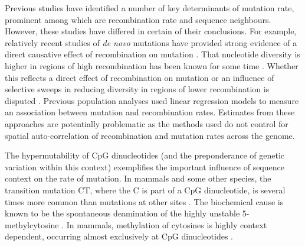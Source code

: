 Previous studies have identified a number of key determinants of mutation rate, prominent among which are recombination rate and sequence neighbours. However, these studies have differed in certain of their conclusions. For example, relatively recent studies of \textit{de novo} mutations have provided strong evidence of a direct causative effect of recombination on mutation \citep{Arbeithuber_Crossovers_2015}. That nucleotide diversity is higher in regions of high recombination has been known for some time \citep{Lercher_2002, Duret_2008}. Whether this reflects a direct effect of recombination on mutation or an influence of selective sweeps in reducing diversity in regions of lower recombination is disputed \citep[e.g.][]{2019.Jensen.000}. Previous population analyses used linear regression models \citep{Lercher_2002, Duret_2008, mugal2011substitution} to measure an association between mutation and recombination rates. Estimates from these approaches are potentially problematic as the methods used do not control for spatial auto-correlation of recombination and mutation rates across the genome.

The hypermutability of CpG dinucleotides (and the preponderance of genetic variation within this context) exemplifies the important influence of sequence context on the rate of mutation. In mammals and some other species, the transition mutation C\textrightarrow T, where the C is part of a CpG dinucleotide, is several times more common than mutations at other sites \citep{Ehrlich_1981}. The biochemical cause is known to be the spontaneous deamination of the highly unstable 5-methylcytosine \citep{Coulondre_1978}. In mammals, methylation of cytosines is highly context dependent, occurring almost exclusively at CpG dinucleotides \citep{ramsahoye2000non}.

